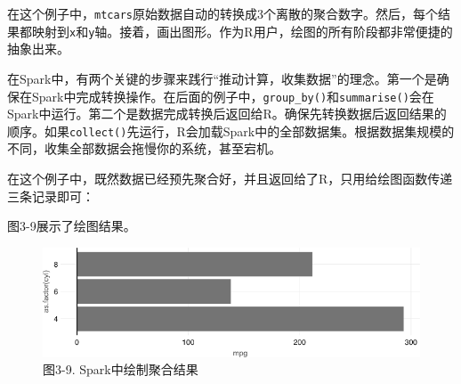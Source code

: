 \documentclass[
]{article}
\newenvironment{Shaded}{\begin{snugshade}}{\end{snugshade}}
\newcommand{\CommentTok}[1]{\textcolor[rgb]{0.56,0.35,0.01}{\textit{#1}}}
\newcommand{\DataTypeTok}[1]{\textcolor[rgb]{0.13,0.29,0.53}{#1}}
\newcommand{\DecValTok}[1]{\textcolor[rgb]{0.00,0.00,0.81}{#1}}
\newcommand{\ErrorTok}[1]{\textcolor[rgb]{0.64,0.00,0.00}{\textbf{#1}}}
\newcommand{\FloatTok}[1]{\textcolor[rgb]{0.00,0.00,0.81}{#1}}
\newcommand{\KeywordTok}[1]{\textcolor[rgb]{0.13,0.29,0.53}{\textbf{#1}}}
\newcommand{\NormalTok}[1]{#1}
\newcommand{\OperatorTok}[1]{\textcolor[rgb]{0.81,0.36,0.00}{\textbf{#1}}}
\newcommand{\OtherTok}[1]{\textcolor[rgb]{0.56,0.35,0.01}{#1}}
\newcommand{\StringTok}[1]{\textcolor[rgb]{0.31,0.60,0.02}{#1}}
\begin{document}
在这个例子中，\texttt{mtcars}原始数据自动的转换成3个离散的聚合数字。然后，每个结果都映射到\texttt{x}和\texttt{y}轴。接着，画出图形。作为R用户，绘图的所有阶段都非常便捷的抽象出来。

在Spark中，有两个关键的步骤来践行``推动计算，收集数据''的理念。第一个是确保在Spark中完成转换操作。在后面的例子中，\texttt{group\_by()}和\texttt{summarise()}会在Spark中运行。第二个是数据完成转换后返回给R。确保先转换数据后返回结果的顺序。如果\texttt{collect()}先运行，R会加载Spark中的全部数据集。根据数据集规模的不同，收集全部数据会拖慢你的系统，甚至宕机。

\begin{Shaded}
\end{Shaded}

在这个例子中，既然数据已经预先聚合好，并且返回给了R，只用给绘图函数传递三条记录即可：

\begin{Shaded}
\end{Shaded}

图3-9展示了绘图结果。

\begin{figure}
\centering
\includegraphics{figures/3_9.png}
\caption{图3-9. Spark中绘制聚合结果}
\end{figure}
\end{document}
